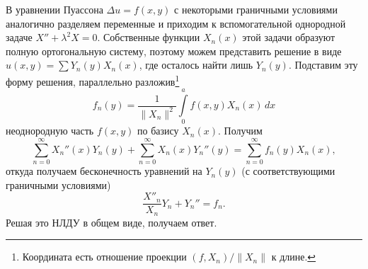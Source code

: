 В уравнении Пуассона $ \Delta u = f(x, y) $ с некоторыми граничными условиями
аналогично разделяем переменные и приходим к вспомогательной однородной задаче
$ X'' + \lambda^2 X = 0 $. Собственные функции $ X_n(x) $ этой задачи образуют
полную ортогональную систему, поэтому можем представить решение в виде $ u(x,
y)= \sum Y_n(y) X_n(x) $, где осталось найти лишь $ Y_n(y) $. Подставим эту
форму решения, параллельно разложив\footnote{Координата есть отношение проекции
$ (f, X_n)/\|X_n\| $ к длине.}
\begin{equation}
  \label{eq:razl}
  f_n(y) = \frac{1}{\|X_n\|^2} \int\limits_{0}^{a}
  f(x, y) X_n(x)\,dx
\end{equation}
неоднородную часть $ f(x, y) $ по базису $ X_n(x) $. Получим  
\[
  \sum_{n=0}^\infty X_n''(x)Y_n(y) + \sum_{n=0}^\infty X_n(x)Y_n''(y) =
  \sum_{n=0}^\infty f_n(y)X_n(x),
\]
откуда получаем бесконечность уравнений на $ Y_n(y) $ (с соответствующими граничными условиями)
\[
  \frac{X''_n}{X_n} Y_n + Y_n'' = f_n.
\]
Решая это НЛДУ в общем виде, получаем ответ.


